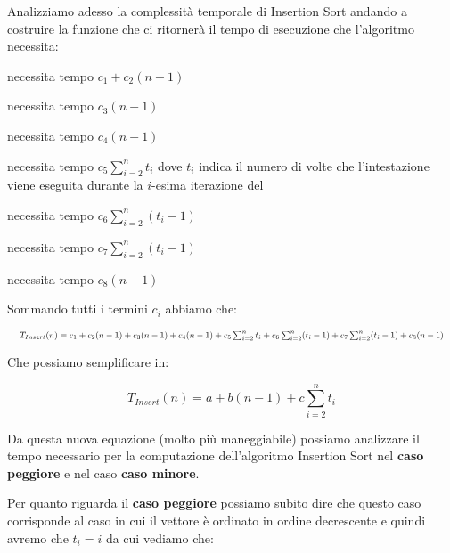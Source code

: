 \begin{flushleft}

Analizziamo adesso la complessità temporale di Insertion Sort andando a costruire la funzione che
ci ritornerà il tempo di esecuzione che l'algoritmo necessita:

\medskip

 necessita tempo $c_1 + c_2 (n - 1)$

\medskip

 necessita tempo $c_3 (n - 1)$

\medskip

 necessita tempo $c_4 (n - 1)$

\medskip

 necessita tempo $c_5 \sum_{i = 2}^{n}t_i$ 
dove $t_i$ indica il numero di volte che l'intestazione viene eseguita durante la 
$i$-esima iterazione del 

\medskip

 necessita tempo $c_6 \sum_{i = 2}^{n}(t_i - 1)$

\medskip

 necessita tempo $c_7 \sum_{i = 2}^{n}(t_i - 1)$

\medskip

 necessita tempo $c_8 (n - 1)$

\medskip

Sommando tutti i termini $c_i$ abbiamo che:

\begin{equation*}
\resizebox{\textwidth}{!}{
$T_{Insert}(n) = c_1 + c_2(n-1) + c_3(n-1) + c_4(n-1) + c_5 \sum_{i = 2}^n t_i + c_6 \sum_{i = 2}^n (t_i-1) 
+ c_7 \sum_{i = 2}^n (t_i-1) + c_8(n-1)$
}
\end{equation*}

Che possiamo semplificare in:

\[ T_{Insert}(n) = a + b(n-1) + c \sum_{i = 2}^n t_i\]

Da questa nuova equazione (molto più maneggiabile) possiamo analizzare il tempo necessario per la computazione
dell'algoritmo Insertion Sort nel \textbf{caso peggiore} e nel caso \textbf{caso minore}.

\medskip

Per quanto riguarda il \textbf{caso peggiore} possiamo subito dire che questo caso corrisponde al caso
in cui il vettore è ordinato in ordine decrescente e quindi avremo che $t_i = i$ da cui vediamo che:


\end{flushleft}

